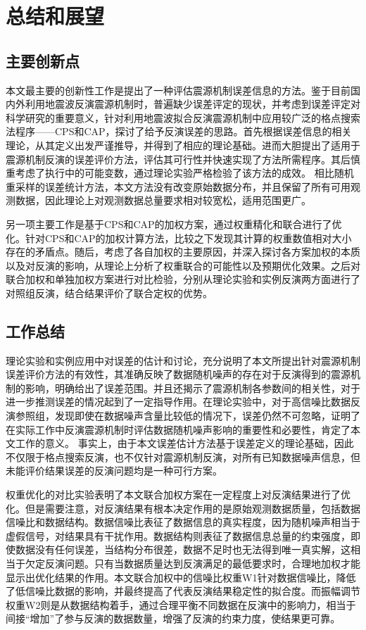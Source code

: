 
\chapter{总结和展望}
\section{主要创新点}
本文最主要的创新性工作是提出了一种评估震源机制误差信息的方法。鉴于目前国内外利用地震波反演震源机制时，普遍缺少误差评定的现状，并考虑到误差评定对科学研究的重要意义，针对利用地震波拟合反演震源机制中应用较广泛的格点搜索法程序——CPS和CAP，探讨了给予反演误差的思路。首先根据误差信息的相关理论，从其定义出发严谨推导，并得到了相应的理论基础。进而大胆提出了适用于震源机制反演的误差评价方法，评估其可行性并快速实现了方法所需程序。其后慎重考虑了执行中的可能变数，通过理论实验严格检验了该方法的成效。
相比\citet{zhenjianchang2015}随机重采样的误差统计方法，本文方法没有改变原始数据分布，并且保留了所有可用观测数据，因此理论上对观测数据总量要求相对较宽松，适用范围更广。

另一项主要工作是基于CPS和CAP的加权方案，通过权重精化和联合进行了优化。针对CPS和CAP的加权计算方法，比较之下发现其计算的权重数值相对大小存在的矛盾点。随后，考虑了各自加权的主要原因，并深入探讨各方案加权的本质以及对反演的影响，从理论上分析了权重联合的可能性以及预期优化效果。之后对联合加权和单独加权方案进行对比检验，分别从理论实验和实例反演两方面进行了对照组反演，结合结果评价了联合定权的优势。

\section{工作总结}
理论实验和实例应用中对误差的估计和讨论，充分说明了本文所提出针对震源机制误差评价方法的有效性，其准确反映了数据随机噪声的存在对于反演得到的震源机制的影响，明确给出了误差范围。并且还揭示了震源机制各参数间的相关性，对于进一步推测误差的情况起到了一定指导作用。在理论实验中，对于高信噪比数据反演参照组，发现即使在数据噪声含量比较低的情况下，误差仍然不可忽略，证明了在实际工作中反演震源机制时评估数据随机噪声影响的重要性和必要性，肯定了本文工作的意义。
事实上，由于本文误差估计方法基于误差定义的理论基础，因此不仅限于格点搜索反演，也不仅针对震源机制反演，对所有已知数据噪声信息，但未能评价结果误差的反演问题均是一种可行方案。

权重优化的对比实验表明了本文联合加权方案在一定程度上对反演结果进行了优化。但是需要注意，对反演结果有根本决定作用的是原始观测数据质量，包括数据信噪比和数据结构。数据信噪比表征了数据信息的真实程度，因为随机噪声相当于虚假信号，对结果具有干扰作用。数据结构则表征了数据信息总量的约束强度，即使数据没有任何误差，当结构分布很差，数据不足时也无法得到唯一真实解，这相当于欠定反演问题。只有当数据质量达到反演满足的最低要求时，合理地加权才能显示出优化结果的作用。本文联合加权中的信噪比权重W1针对数据信噪比，降低了低信噪比数据的影响，并最终提高了代表反演结果稳定性的拟合度。而振幅调节权重W2则是从数据结构着手，通过合理平衡不同数据在反演中的影响力，相当于间接“增加”了参与反演的数据数量，增强了反演的约束力度，使结果更可靠。

